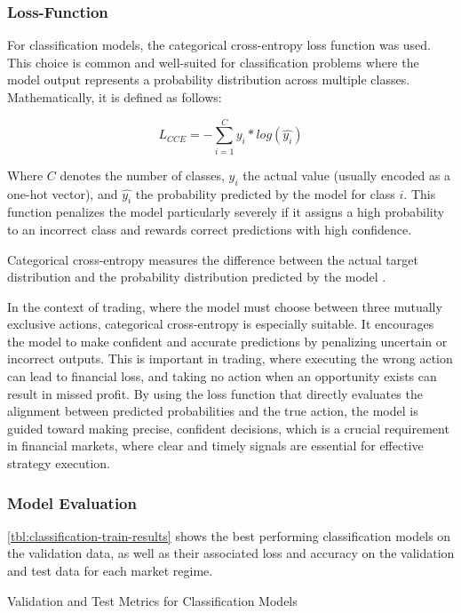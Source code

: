 \subsubsection{Loss-Function}

For classification models, the categorical cross-entropy loss function was used.
This choice is common and well-suited for classification problems where the model output represents a probability distribution across multiple classes.
Mathematically, it is defined as follows:

\[
    L_{CCE} = -\sum_{i=1}^{C} y_i*log(\hat{y_i})
\]

\noindent
Where $C$ denotes the number of classes, $y_i$ the actual value (usually encoded as a one-hot vector), and $\hat{y_i}$ the probability predicted by the model for class $i$.
This function penalizes the model particularly severely if it assigns a high probability to an incorrect class and rewards correct predictions with high confidence.

Categorical cross-entropy measures the difference between the actual target distribution and the probability distribution predicted by the model \cite{springer-ml-basics}.

In the context of trading, where the model must choose between three mutually exclusive actions, categorical cross-entropy is especially suitable.
It encourages the model to make confident and accurate predictions by penalizing uncertain or incorrect outputs.
This is important in trading, where executing the wrong action can lead to financial loss, and taking no action when an opportunity exists can result in missed profit.
By using the loss function that directly evaluates the alignment between predicted probabilities and the true action, the model is guided toward making precise, confident decisions, which is a crucial requirement in financial markets, where clear and timely signals are essential for effective strategy execution.

\subsubsection{Model Evaluation}

\autoref{tbl:classification-train-results} shows the best performing classification models on the validation data, as well as their associated loss and accuracy on the validation and test data for each market regime.

\begin{table}[H]
    \centering
    
    \caption{Validation and Test Metrics for Classification Models}
    \label{tbl:classification-train-results}
\end{table}

